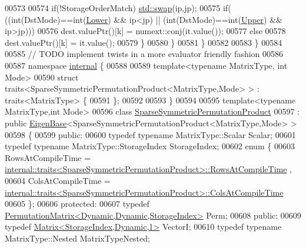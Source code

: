 \begin{DoxyCode}
00573       
00574       \textcolor{keywordflow}{if}(!StorageOrderMatch) \hyperlink{endian_8c_a3ca5ecd34b04d6a243c054ac3a57f68d}{std::swap}(ip,jp);
00575       \textcolor{keywordflow}{if}( ((\textcolor{keywordtype}{int}(DstMode)==\textcolor{keywordtype}{int}(\hyperlink{group__enums_gga39e3366ff5554d731e7dc8bb642f83cda891792b8ed394f7607ab16dd716f60e6}{Lower}) && ip<jp) || (\textcolor{keywordtype}{int}(DstMode)==\textcolor{keywordtype}{int}(\hyperlink{group__enums_gga39e3366ff5554d731e7dc8bb642f83cda6bcb58be3b8b8ec84859ce0c5ac0aaec}{Upper}) && ip>jp)))
00576         dest.valuePtr()[k] = numext::conj(it.value());
00577       \textcolor{keywordflow}{else}
00578         dest.valuePtr()[k] = it.value();
00579     \}
00580   \}
00581 \}
00582 
00583 \}
00584 
00585 \textcolor{comment}{// TODO implement twists in a more evaluator friendly fashion}
00586 
00587 \textcolor{keyword}{namespace }\hyperlink{namespaceinternal}{internal} \{
00588 
00589 \textcolor{keyword}{template}<\textcolor{keyword}{typename} MatrixType, \textcolor{keywordtype}{int} Mode>
00590 \textcolor{keyword}{struct }traits<SparseSymmetricPermutationProduct<MatrixType,Mode> > : traits<MatrixType> \{
00591 \};
00592 
00593 \}
00594 
00595 \textcolor{keyword}{template}<\textcolor{keyword}{typename} MatrixType,\textcolor{keywordtype}{int} Mode>
00596 \textcolor{keyword}{class }\hyperlink{class_eigen_1_1_sparse_symmetric_permutation_product}{SparseSymmetricPermutationProduct}
00597   : \textcolor{keyword}{public} \hyperlink{group___core___module_struct_eigen_1_1_eigen_base}{EigenBase}<SparseSymmetricPermutationProduct<MatrixType,Mode> >
00598 \{
00599   \textcolor{keyword}{public}:
00600     \textcolor{keyword}{typedef} \textcolor{keyword}{typename} MatrixType::Scalar Scalar;
00601     \textcolor{keyword}{typedef} \textcolor{keyword}{typename} MatrixType::StorageIndex StorageIndex;
00602     \textcolor{keyword}{enum} \{
00603       RowsAtCompileTime = 
      \hyperlink{struct_eigen_1_1internal_1_1traits}{internal::traits<SparseSymmetricPermutationProduct>::RowsAtCompileTime}
      ,
00604       ColsAtCompileTime = 
      \hyperlink{struct_eigen_1_1internal_1_1traits}{internal::traits<SparseSymmetricPermutationProduct>::ColsAtCompileTime}
00605     \};
00606   \textcolor{keyword}{protected}:
00607     \textcolor{keyword}{typedef} \hyperlink{group___core___module}{PermutationMatrix<Dynamic,Dynamic,StorageIndex>} 
      Perm;
00608   \textcolor{keyword}{public}:
00609     \textcolor{keyword}{typedef} \hyperlink{group___core___module}{Matrix<StorageIndex,Dynamic,1>} VectorI;
00610     \textcolor{keyword}{typedef} \textcolor{keyword}{typename} MatrixType::Nested MatrixTypeNested;

\end{DoxyCode}
